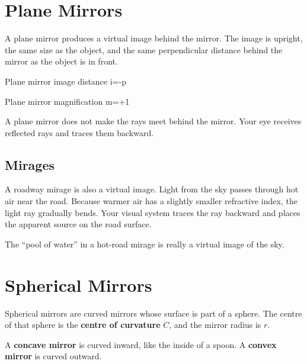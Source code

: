 \documentclass{studentnotes}
\begin{document}
\section{Plane Mirrors}

A plane mirror produces a virtual image behind the mirror. The image is upright,
the same size as the object, and the same perpendicular distance behind the
mirror as the object is in front.

\begin{namedformula}{Plane mirror image distance}
    i=-p
\end{namedformula}

\begin{namedformula}{Plane mirror magnification}
    m=+1
\end{namedformula}

\begin{quicknote}
    A plane mirror does not make the rays meet behind the mirror. Your eye
    receives reflected rays and traces them backward.
\end{quicknote}

\subsection{Mirages}

A roadway mirage is also a virtual image. Light from the sky passes through hot
air near the road. Because warmer air has a slightly smaller refractive index,
the light ray gradually bends. Your visual system traces the ray backward and
places the apparent source on the road surface.

\begin{personalnote}
    The ``pool of water'' in a hot-road mirage is really a virtual image of the
    sky.
\end{personalnote}

\section{Spherical Mirrors}

Spherical mirrors are curved mirrors whose surface is part of a sphere. The
centre of that sphere is the \textbf{centre of curvature} \(C\), and the mirror
radius is \(r\).

\begin{definition}
    A \textbf{concave mirror} is curved inward, like the inside of a spoon. A
    \textbf{convex mirror} is curved outward.
\end{definition}
\end{document}
